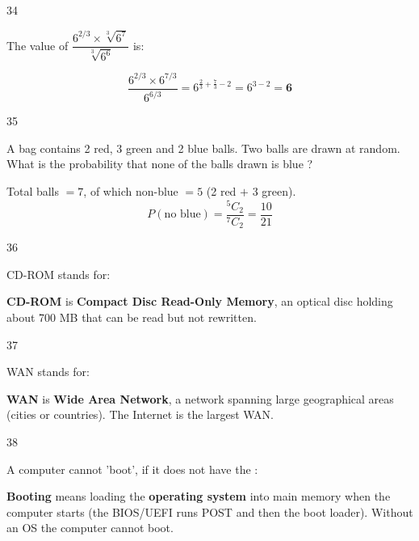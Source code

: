 \begin{question}{34}
{The value of $\dfrac{6^{2/3}\times\sqrt[3]{6^7}}{\sqrt[3]{6^6}}$ is:\par}
\begin{explain}
\[\frac{6^{2/3}\times6^{7/3}}{6^{6/3}}=6^{\frac23+\frac73-2}=6^{3-2}=\mathbf{6}\]
\end{explain}
\end{question}

\begin{question}{35}
{A bag contains 2 red, 3 green and 2 blue balls. Two balls are drawn at random. What is the probability that none of the balls drawn is blue ?\par}
\begin{explain}
Total balls $=7$, of which non-blue $=5$ (2 red $+$ 3 green).
\[P(\text{no blue})=\frac{{}^5C_2}{{}^7C_2}=\frac{10}{21}\]
\end{explain}
\end{question}

\begin{question}{36}
{CD-ROM stands for:\par}
\begin{explain}
\textbf{CD-ROM} is \textbf{Compact Disc Read-Only Memory}, an optical disc holding about 700 MB that can be read but not rewritten.
\end{explain}
\end{question}

\begin{question}{37}
{WAN stands for:\par}
\begin{explain}
\textbf{WAN} is \textbf{Wide Area Network}, a network spanning large geographical areas (cities or countries). The Internet is the largest WAN.
\end{explain}
\end{question}

\begin{question}{38}
{A computer cannot 'boot', if it does not have the :\par}
\begin{explain}
\textbf{Booting} means loading the \textbf{operating system} into main memory when the computer starts (the BIOS/UEFI runs POST and then the boot loader). Without an OS the computer cannot boot.
\end{explain}
\end{question}

